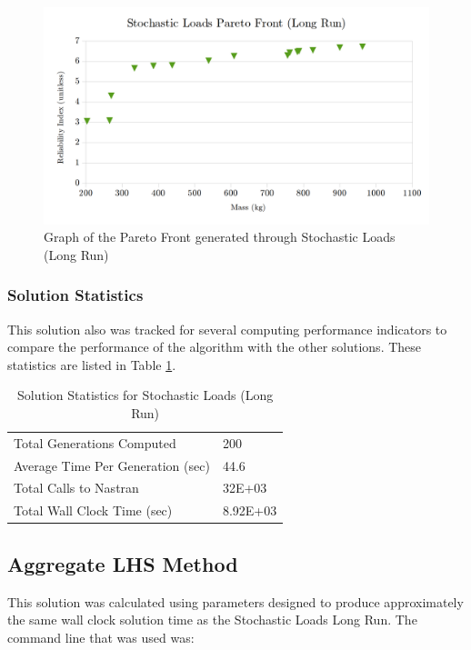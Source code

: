 \begin{figure}
\includegraphics[width=\textwidth]{img/pf_sto_long.png}
	\caption{Graph of the Pareto Front generated through Stochastic Loads (Long Run)}
\label{fig:pfront_sto_long}
\end{figure}

\subsubsection{Solution Statistics}
This solution also was tracked for several computing performance indicators to compare the performance of the algorithm with the other solutions. These statistics are listed in Table \ref{tab:stat_sto_long}. 

\begin{table}[!htbp]
  \caption{Solution Statistics for Stochastic Loads (Long Run)}
  \label{tab:stat_sto_long}
  \centering
  \begin{tabular}{|l|l|}
    \hline
    Total Generations Computed & 200\\
    Average Time Per Generation (sec) & 44.6\\
    Total Calls to Nastran & 32E+03\\
    Total Wall Clock Time (sec)	 & 8.92E+03\\
    \hline
  \end{tabular}
\end{table}




\subsection{Aggregate LHS Method}
This solution was calculated using parameters designed to produce approximately the same wall clock solution time as the Stochastic Loads Long Run. The command line that was used was:

